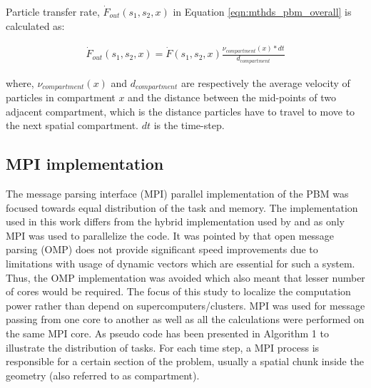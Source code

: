 \documentclass[preprint,10pt,authoryear,review]{elsarticle}
\begin{document}
\begin{linenumbers}
 Particle transfer rate, $\dot{F}_{out}(s_1,s_2,x)$ in Equation \ref{eqn:mthds_pbm_overall} is calculated 
as:

\begin{align}
\dot{F}_{out}(s_1,s_2,x) = \dot{F}(s_1,s_2,x)\frac{\nu_{compartment}(x)*dt}{d_{compartment}}
\label{eqn:mthds_f_out_dot_part_trans_rate}
\end{align}

where, $\nu_{compartment}(x)$ and $d_{compartment}$ are respectively the average velocity of 
particles in compartment $x$ and the distance between the mid-points of two adjacent compartment, 
which is the distance particles have to travel to move to the next spatial compartment. $dt$ is the 
time-step.

\subsection{MPI implementation}
The message parsing interface (MPI) parallel implementation of the PBM was 
focused towards equal distribution of the task and memory. The implementation 
used in this work differs from the hybrid implementation used by \citep{Bettencourt2017}
and \citep{Sampat2018} as only MPI was used to parallelize the code. It 
was pointed by \citep{Sampat2018} that open message parsing (OMP) does not 
provide significant speed improvements due to limitations with usage of 
dynamic vectors which are essential for such a system. Thus, the OMP 
implementation was avoided which also meant that lesser number of cores 
would be required. The focus of this study to localize the computation power 
rather than depend on supercomputers/clusters. MPI was used for message passing 
from one core to another as well as all the calculations  
were performed on the same MPI core. As pseudo code has been presented in Algorithm 1 
to illustrate the distribution of tasks. For each time step, a MPI process is responsible 
for a certain section of the problem, usually a spatial chunk inside the geometry 
(also referred to as compartment).  


\end{linenumbers}
\end{document}

